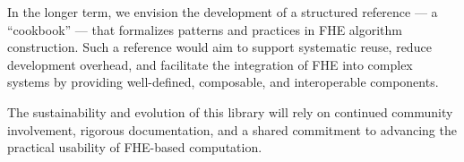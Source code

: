 \documentclass[article]{iacrtrans}
\begin{document}
In the longer term, we envision the development of a structured reference — a ``cookbook'' — that formalizes patterns and practices in FHE algorithm construction. Such a reference would aim to support systematic reuse, reduce development overhead, and facilitate the integration of FHE into complex systems by providing well-defined, composable, and interoperable components.

The sustainability and evolution of this library will rely on continued community involvement, rigorous documentation, and a shared commitment to advancing the practical usability of FHE-based computation.

\printbibliography
\end{document}
